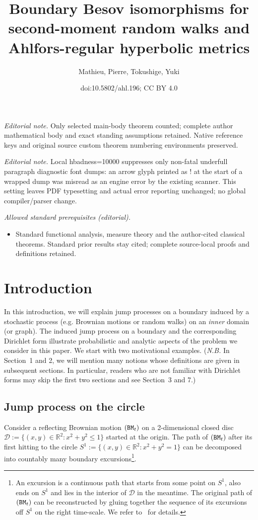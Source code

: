\documentclass[10pt]{amsart}
\title{Boundary Besov isomorphisms for second-moment random walks and Ahlfors-regular hyperbolic metrics}
\author{Mathieu, Pierre, Tokushige, Yuki}
\date{doi:10.5802/ahl.196; CC BY 4.0}
\theoremstyle{definition}\newtheorem{defi}[theo]{Definition}\newtheorem{rema}[theo]{Remark}\newtheorem{exam}[theo]{Example}\newtheorem{exem}[theo]{Example}\newtheorem{nota}[theo]{Notation}
\newcommand{\cd}{\mathcal{D}}
\newcommand{\br}{\mathbb{R}}
\begin{document}
\maketitle
\noindent\textit{Editorial note.} Only selected main-body theorem counted; complete author mathematical body and exact standing assumptions retained. Native reference keys and original source custom theorem numbering environments preserved.\par\medskip
\noindent\textit{Editorial note.} Local hbadness=10000 suppresses only non-fatal underfull paragraph diagnostic font dumps: an arrow glyph printed as ! at the start of a wrapped dump was misread as an engine error by the existing scanner. This setting leaves PDF typesetting and actual error reporting unchanged; no global compiler/parser change.\par\medskip
\noindent\textit{Allowed standard prerequisites (editorial).}\begin{itemize}
\item Standard functional analysis, measure theory and the author-cited classical theorems. Standard prior results stay cited; complete source-local proofs and definitions retained.
\end{itemize}\medskip



\section{Introduction}\label{intro}
In this introduction, we will explain jump processes on a boundary induced by a stochastic process (e.g. Brownian motions or random walks) on an \emph{inner} domain (or graph). The induced jump process on a boundary and the corresponding Dirichlet form illustrate probabilistic and analytic aspects of the problem we consider in this paper. We start with two motivational examples. (\emph{N.B.} In Section~1 and 2, we will mention many notions whose definitions are given in subsequent sections. In particular, readers who are not familiar with Dirichlet forms may skip the first two sections and see Section~3 and 7.)



\subsection*{Jump process on the circle} Consider a reflecting Brownian motion $({\tt BM}_t)$ on a 2-dimensional closed disc $\cd:=\{(x,y)\in\br^2:x^2+y^2\leq1\}$ started at the origin. The path of $({\tt BM}_t)$ after its first hitting to the circle $S^1:=\{(x,y)\in\br^2:x^2+y^2=1\}$ can be decomposed into countably many boundary excursions\footnote{ An excursion is a continuous path that starts from some point on $S^1$, also ends on $S^1$ and lies in the interior of $\cd$ in the meantime. The original path of $({\tt BM}_t)$ can be reconstructed by gluing together the sequence of its excursions off $S^1$ on the right time-scale. We refer to~\cite{Bu} for details.}.
\end{document}

